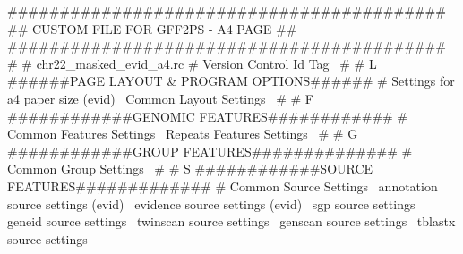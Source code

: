 \documentclass[11pt]{article}
\def\nwendcode{\endtrivlist \endgroup} %
\let\nwdocspar=\par                    %
\begin{document}
\nwenddocs{}\endmoddef
##########################################
##   CUSTOM FILE FOR GFF2PS - A4 PAGE   ##
##########################################
#
# chr22_masked_evid_a4.rc
#
\LA{}Version Control Id Tag~{\nwtagstyle{}}\RA{}
#
# L ######PAGE LAYOUT & PROGRAM OPTIONS######
#
\LA{}Settings for a4 paper size (evid)~{\nwtagstyle{}}\RA{}
\LA{}Common Layout Settings~{\nwtagstyle{}}\RA{}
#
# F ############GENOMIC FEATURES############
#
\LA{}Common Features Settings~{\nwtagstyle{}}\RA{}
\LA{}Repeats Features Settings~{\nwtagstyle{}}\RA{}
#
# G ############GROUP FEATURES##############
#
\LA{}Common Group Settings~{\nwtagstyle{}}\RA{}
#
# S ############SOURCE FEATURES#############
#
\LA{}Common Source Settings~{\nwtagstyle{}}\RA{}
\LA{}annotation source settings (evid)~{\nwtagstyle{}}\RA{}
\LA{}evidence source settings (evid)~{\nwtagstyle{}}\RA{}
\LA{}sgp source settings~{\nwtagstyle{}}\RA{}
\LA{}geneid source settings~{\nwtagstyle{}}\RA{}
\LA{}twinscan source settings~{\nwtagstyle{}}\RA{}
\LA{}genscan source settings~{\nwtagstyle{}}\RA{}
\LA{}tblastx source settings~{\nwtagstyle{}}\RA{}
\nwendcode{}\nwdocspar
\end{document}
